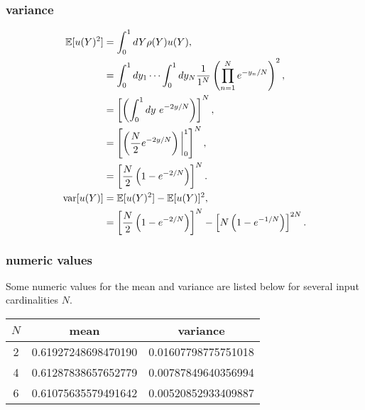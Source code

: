 \subsubsection{variance}
\begin{align}
\mathbb{E}[ u(Y)^2] &= \int_{0}^1 dY \rho(Y)u(Y),\\
  &=\int_{0}^1 dy_1\cdots\int_{0}^1 dy_N \frac{1}{1^N} \left(\prod_{n=1}^N e^{-y_n/N}\right)^2,\\
  &=\left[\left(\int_{0}^1 dy\ e^{-2y/N} \right)\right]^N,\\
  &=\left[\left(\frac{N}{2}e^{-2y/N} \right)\bigg|_{0}^1 \right]^N,\\
  &=\left[\frac{N}{2}\left(1-e^{-2/N}\right)\right]^N.\\
\text{var}[u(Y)] &= \mathbb{E}[ u(Y)^2]-\mathbb{E}[ u(Y)]^2,\\
  &= \left[\frac{N}{2}\left(1-e^{-2/N}\right)\right]^N - \left[N\left(1-e^{-1/N}\right)\right]^{2N}.
\end{align}
\subsubsection{numeric values}
Some numeric values for the mean and variance are listed below for several input cardinalities $N$.
\begin{table}[h!]
\centering
\begin{tabular}{c|c|c}
$N$ & mean & variance \\ \hline
2 & 0.61927248698470190 & 0.01607798775751018 \\
4 & 0.61287838657652779 & 0.00787849640356994 \\
6 & 0.61075635579491642 & 0.00520852933409887
\end{tabular}
\end{table}
